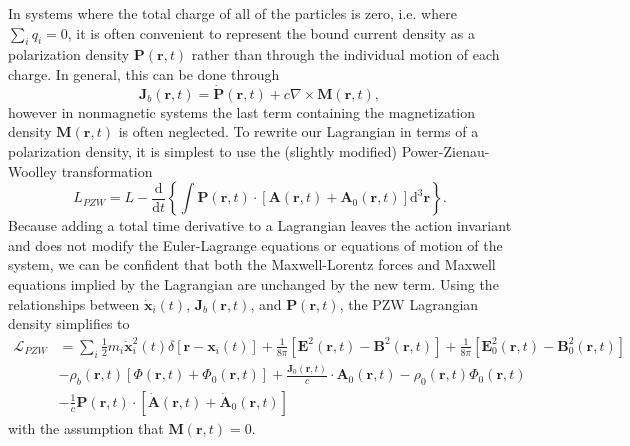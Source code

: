 \documentclass{article}
\begin{document}
In systems where the total charge of all of the particles is zero, i.e. where $\sum_iq_i = 0$, it is often convenient to represent the bound current density as a polarization density $\mathbf{P}(\mathbf{r},t)$ rather than through the individual motion of each charge. In general, this can be done through
\begin{equation}
\mathbf{J}_b(\mathbf{r},t) = \dot{\mathbf{P}}(\mathbf{r},t) + c\nabla\times\mathbf{M}(\mathbf{r},t),
\end{equation}
however in nonmagnetic systems the last term containing the magnetization density $\mathbf{M}(\mathbf{r},t)$ is often neglected. To rewrite our Lagrangian in terms of a polarization density, it is simplest to use the (slightly modified) Power-Zienau-Woolley transformation
\begin{equation}
L_{PZW} = L - \frac{\mathrm{d}}{\mathrm{d}t}\left\{\int\mathbf{P}(\mathbf{r},t)\cdot\left[\mathbf{A}(\mathbf{r},t) + \mathbf{A}_0(\mathbf{r},t)\right]\mathrm{d}^3\mathbf{r}\right\}.
\end{equation}
Because adding a total time derivative to a Lagrangian leaves the action invariant and does not modify the Euler-Lagrange equations or equations of motion of the system, we can be confident that both the Maxwell-Lorentz forces and Maxwell equations implied by the Lagrangian are unchanged by the new term. Using the relationships between $\dot{\mathbf{x}}_i(t)$, $\mathbf{J}_b(\mathbf{r},t)$, and $\mathbf{P}(\mathbf{r},t)$, the PZW Lagrangian density simplifies to
\begin{equation}
\begin{split}
\mathcal{L}_{PZW} &= \sum_i\frac{1}{2}m_i\dot{\mathbf{x}}_i^2(t)\delta[\mathbf{r} - \mathbf{x}_i(t)] + \frac{1}{8\pi}\left[\mathbf{E}^2(\mathbf{r},t) - \mathbf{B}^2(\mathbf{r},t)\right] + \frac{1}{8\pi}\left[\mathbf{E}_0^2(\mathbf{r},t) - \mathbf{B}_0^2(\mathbf{r},t)\right]\\
& - \rho_b(\mathbf{r},t)\left[\Phi(\mathbf{r},t) + \Phi_0(\mathbf{r},t)\right] + \frac{\mathbf{J}_0(\mathbf{r},t)}{c}\cdot\mathbf{A}_0(\mathbf{r},t) - \rho_0(\mathbf{r},t)\Phi_0(\mathbf{r},t)\\
& - \frac{1}{c}\mathbf{P}(\mathbf{r},t)\cdot\left[\dot{\mathbf{A}}(\mathbf{r},t) + \dot{\mathbf{A}}_0(\mathbf{r},t)\right]
\end{split}
\end{equation}
with the assumption that $\mathbf{M}(\mathbf{r},t) = 0$.
\end{document}
